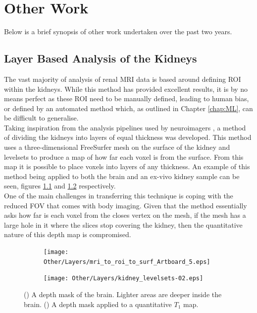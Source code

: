 \chapter{Other Work}
\label{chap:other}

Below is a brief synopsis of other work undertaken over the past two years.

\section{Layer Based Analysis of the Kidneys}

The vast majority of analysis of renal \ac{MRI} data is based around defining \ac{ROI} within the kidneys. While this method has provided excellent results, it is by no means perfect as these \ac{ROI} need to be manually defined, leading to human bias, or defined by an automated method which, as outlined in Chapter \ref{chap:ML}, can be difficult to generalise.\\

Taking inspiration from the analysis pipelines used by neuroimagers \cite{self_benchmarking_2019, muckli_contextual_2015, waehnert_anatomically_2014}, a method of dividing the kidneys into layers of equal thickness was developed. This method uses a three-dimensional FreeSurfer mesh on the surface of the kidney \cite{dale_cortical_1999} and levelsets to produce a map of how far each voxel is from the surface. From this map it is possible to place voxels into layers of any thickness. An example of this method being applied to both the brain and an ex-vivo kidney sample can be seen, figures \ref{fig:layers_brain} and \ref{fig:layers_kidney} respectively.\\

One of the main challenges in transferring this technique is coping with the reduced \ac{FOV} that comes with body imaging. Given that the method essentially asks how far is each voxel from the closes vertex on the mesh, if the mesh has a large hole in it where the slices stop covering the kidney, then the quantitative nature of this depth map is compromised.\\

\begin{figure}[H]
	\centering
	\begin{subfigure}[c]{0.47\textwidth}
		\centering
		\texttt{[image: Other/Layers/mri\_to\_roi\_to\_surf\_Artboard\_5.eps]}
		\caption{}
		\label{fig:layers_brain}
	\end{subfigure}
	\hfill
	\begin{subfigure}[c]{0.47\textwidth}
		\centering
		\texttt{[image: Other/Layers/kidney\_levelsets-02.eps]}
		\caption{}
		\label{fig:layers_kidney}
	\end{subfigure}
	\caption{() A depth mask of the brain. Lighter areas are deeper inside the brain. () A depth mask applied to a quantitative $T_1$ map.}
	\label{fig:layers_example}
\end{figure}

